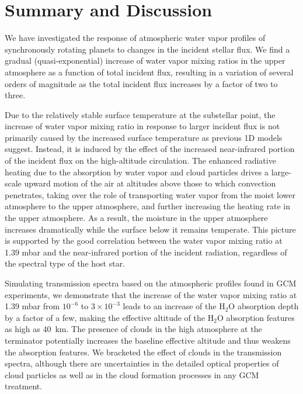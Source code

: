 \documentclass[11pt,numberedappendix,twocolappendix,]{emulateapj}
\def\water{H$_2$O}
\def\preslevel{1.39 mbar}
\def\wv{water vapor}
\newcommand{\yf}[1]{{\color{orange}#1}}
\begin{document}
\section{Summary and Discussion}
\label{s:summary}

We have investigated the response of atmospheric \wv{} profiles of synchronously rotating planets to changes in the incident stellar flux. 
We find a gradual (quasi-exponential) increase of \wv{} mixing ratios in the upper atmosphere as a function of total incident flux, resulting in a variation of several orders of magnitude as the total incident flux increases by a factor of two to three. 

Due to the relatively stable surface temperature at the substellar point, the increase of \wv{} mixing ratio in response to larger incident flux is not primarily caused by the increased surface temperature as previous 1D models suggest. 
Instead, it is induced by \yf{the effect of } the increased near-infrared portion of the incident flux \yf{on the high-altitude circulation}. 
The enhanced radiative heating due to the absorption by \wv{} \yf{and cloud particles} drives \yf{a large-scale} upward motion of the air \yf{at altitudes above those to which convection penetrates, taking over}
the role of transporting \wv{} from the moist lower atmosphere to the upper atmosphere, and further increasing the heating rate in the upper atmosphere.
As a result, the moisture in the upper atmosphere increases dramatically while the surface below it remains temperate. 
This picture is supported by the good correlation between the \wv{} mixing ratio at \preslevel{} and the near-infrared portion of the incident radiation, regardless of the spectral type of the host star. 

Simulating transmission spectra based on the atmospheric profiles found in GCM experiments, 
we demonstrate that the increase of the \wv{} mixing ratio at \preslevel{} from $10^{-6}$ to $3 \times 10^{-3}$ leads to an increase of the \water{} absorption depth by a factor of a few, making the effective altitude of the \water{} absorption features as high as 40~km. 
The presence of clouds in the high atmosphere at the terminator potentially increases the baseline effective altitude and thus weakens the absorption features. 
We bracketed the effect of clouds in the transmission spectra, 
although there are uncertainties in the detailed optical properties of cloud particles as well as in the cloud formation processes in any GCM treatment. 
\end{document}
